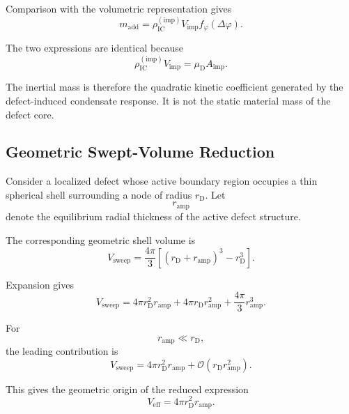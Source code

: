 Comparison with the volumetric representation gives
\begin{equation}
    \boxed{ m_{\mathrm{add}} = \rho_{\mathrm{IC}}^{(\mathrm{imp})} V_{\mathrm{imp}} f_{\varphi}(\Delta\varphi) }.
\end{equation}

The two expressions are identical because
\begin{equation}
    \rho_{\mathrm{IC}}^{(\mathrm{imp})} V_{\mathrm{imp}} = \mu_{\mathrm{D}} A_{\mathrm{imp}}.
\end{equation}

The inertial mass is therefore the quadratic kinetic coefficient generated by the defect-induced condensate response. It is not the static material mass of the defect core.

\subsection{Geometric Swept-Volume Reduction}

Consider a localized defect whose active boundary region occupies a thin spherical shell surrounding a node of radius $r_{\mathrm{D}}$. Let
\begin{equation}
    r_{\mathrm{amp}}
\end{equation}
denote the equilibrium radial thickness of the active defect structure.

The corresponding geometric shell volume is
\begin{equation}
    V_{\mathrm{sweep}} = \frac{4\pi}{3} \left[ \left( r_{\mathrm{D}}+r_{\mathrm{amp}} \right)^3 - r_{\mathrm{D}}^3 \right].
\end{equation}

Expansion gives
\begin{equation}
    V_{\mathrm{sweep}} = 4\pi r_{\mathrm{D}}^2 r_{\mathrm{amp}} + 4\pi r_{\mathrm{D}}r_{\mathrm{amp}}^2 + \frac{4\pi}{3}r_{\mathrm{amp}}^3.
\end{equation}

For
\begin{equation}
    r_{\mathrm{amp}} \ll r_{\mathrm{D}},
\end{equation}
the leading contribution is
\begin{equation}
    \boxed{ V_{\mathrm{sweep}} = 4\pi r_{\mathrm{D}}^2 r_{\mathrm{amp}} + \mathcal{O} \left( r_{\mathrm{D}}r_{\mathrm{amp}}^2 \right) }.
\end{equation}

This gives the geometric origin of the reduced expression
\begin{equation}
    V_{\mathrm{eff}} = 4\pi r_{\mathrm{D}}^2 r_{\mathrm{amp}}.
\end{equation}

